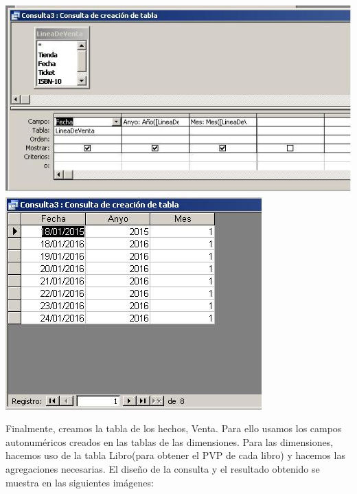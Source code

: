 \documentclass[paper=a4, fontsize=11pt, spanish]{scrartcl}
\numberwithin{equation}{section} %
\numberwithin{figure}{section} %
\numberwithin{table}{section} %
\begin{document}
\begin{center}
	\includegraphics[scale=0.6]{5.JPG}
	\includegraphics[scale=0.6]{6.JPG}
\end{center}
Finalmente, creamos la tabla de los hechos, Venta. Para ello usamos los campos autonuméricos creados en las tablas de las dimensiones. Para las dimensiones, hacemos uso de la tabla Libro(para obtener el PVP de cada libro) y hacemos las agregaciones necesarias.
El diseño de la consulta y el resultado obtenido se muestra en las siguientes imágenes: 
\end{document}

